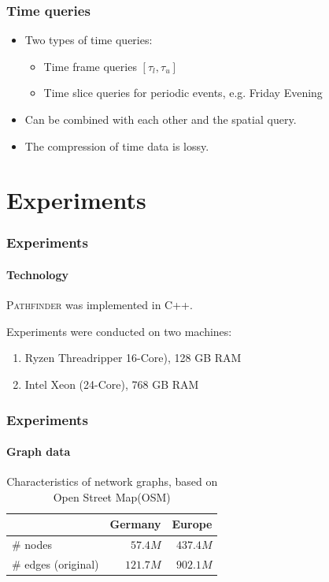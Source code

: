 \documentclass[10pt, t,
aspectratio=169,%
]{beamer}
\newcommand{\pathfinder}{\textsc{Pathfinder}\xspace}
\begin{document}
\begin{frame}
	\frametitle{Time queries}
	\begin{itemize}

		\item	Two types of time queries: \pause
		      \begin{itemize}
			      \item Time frame queries $[\tau_l, \tau_u]$ \pause
			      \item Time slice queries for periodic events, e.g. Friday Evening \pause
		      \end{itemize}

		\item Can be combined with each other and the spatial query. \pause

		\item The compression of time data is lossy.
	\end{itemize}
\end{frame}

\section{Experiments}

\begin{frame}
	\frametitle{Experiments}
	\framesubtitle{Technology}
	\pathfinder was implemented in C++. \pause
	\medskip

	Experiments were conducted on two machines: \pause
	\begin{enumerate}
		\item Ryzen Threadripper 16-Core), 128 GB RAM
		\item Intel Xeon (24-Core), 768 GB RAM
	\end{enumerate}
\end{frame}

\begin{frame}
	\frametitle{Experiments}
	\framesubtitle{Graph data}
	\begin{table}
		{
			\caption{Characteristics of network graphs, based on Open Street Map(OSM)}
			\begin{tabular}{|l|rr|}
				\hline
				                    & Germany  & Europe
				\\ \hline
				\# nodes            & $57.4M$  & $437.4M$ \\
				\# edges (original) & $121.7M$ & $902.1M$ \\
				\hline
			\end{tabular}
		}
	\end{table}
\end{frame}
\end{document}
